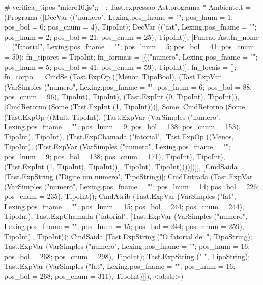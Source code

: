 \documentclass[12pt,a4paper,twoside]{article}
\begin{document}
\begin{terminal}
# verifica_tipos "micro10.js";;
- : Tast.expressao Ast.programa * Ambiente.t =
(Programa
  ([DecVar
     (("numero",
       {Lexing.pos_fname = ""; pos_lnum = 1; pos_bol = 0; pos_cnum = 4}),
     TipoInt);
    DecVar
     (("fat",
       {Lexing.pos_fname = ""; pos_lnum = 2; pos_bol = 21; pos_cnum = 25}),
     TipoInt)],
  [Funcao
    {Ast.fn_nome =
      ("fatorial",
       {Lexing.pos_fname = ""; pos_lnum = 5; pos_bol = 41; pos_cnum = 50});
     fn_tiporet = TipoInt;
     fn_formais =
      [(("numero",
         {Lexing.pos_fname = ""; pos_lnum = 5; pos_bol = 41; pos_cnum = 59}),
        TipoInt)];
     fn_locais = [];
     fn_corpo =
      [CmdSe
        (Tast.ExpOp ((Menor, TipoBool),
          (Tast.ExpVar
            (VarSimples
              ("numero",
               {Lexing.pos_fname = ""; pos_lnum = 6; pos_bol = 88;
                pos_cnum = 96}),
            TipoInt),
           TipoInt),
          (Tast.ExpInt (0, TipoInt), TipoInt)),
        [CmdRetorno (Some (Tast.ExpInt (1, TipoInt)))],
        Some
         [CmdRetorno
           (Some
             (Tast.ExpOp ((Mult, TipoInt),
               (Tast.ExpVar
                 (VarSimples
                   ("numero",
                    {Lexing.pos_fname = ""; pos_lnum = 9; pos_bol = 138;
                     pos_cnum = 153}),
                 TipoInt),
                TipoInt),
               (Tast.ExpChamada ("fatorial",
                 [Tast.ExpOp ((Menos, TipoInt),
                   (Tast.ExpVar
                     (VarSimples
                       ("numero",
                        {Lexing.pos_fname = ""; pos_lnum = 9; pos_bol = 138;
                         pos_cnum = 171}),
                     TipoInt),
                    TipoInt),
                   (Tast.ExpInt (1, TipoInt), TipoInt))],
                 TipoInt),
                TipoInt))))])]}],
  [CmdSaida [Tast.ExpString ("Digite um numero", TipoString)];
   CmdEntrada
    (Tast.ExpVar
      (VarSimples
        ("numero",
         {Lexing.pos_fname = ""; pos_lnum = 14; pos_bol = 226;
          pos_cnum = 235}),
      TipoInt));
   CmdAtrib
    (Tast.ExpVar
      (VarSimples
        ("fat",
         {Lexing.pos_fname = ""; pos_lnum = 15; pos_bol = 244;
          pos_cnum = 244}),
      TipoInt),
    Tast.ExpChamada ("fatorial",
     [Tast.ExpVar
       (VarSimples
         ("numero",
          {Lexing.pos_fname = ""; pos_lnum = 15; pos_bol = 244;
           pos_cnum = 259}),
       TipoInt)],
     TipoInt));
   CmdSaida
    [Tast.ExpString ("O fatorial de: ", TipoString);
     Tast.ExpVar
      (VarSimples
        ("numero",
         {Lexing.pos_fname = ""; pos_lnum = 16; pos_bol = 268;
          pos_cnum = 298}),
      TipoInt);
     Tast.ExpString (" ", TipoString);
     Tast.ExpVar
      (VarSimples
        ("fat",
         {Lexing.pos_fname = ""; pos_lnum = 16; pos_bol = 268;
          pos_cnum = 311}),
      TipoInt)]]),
 <abstr>)

\end{terminal}
\end{document}
